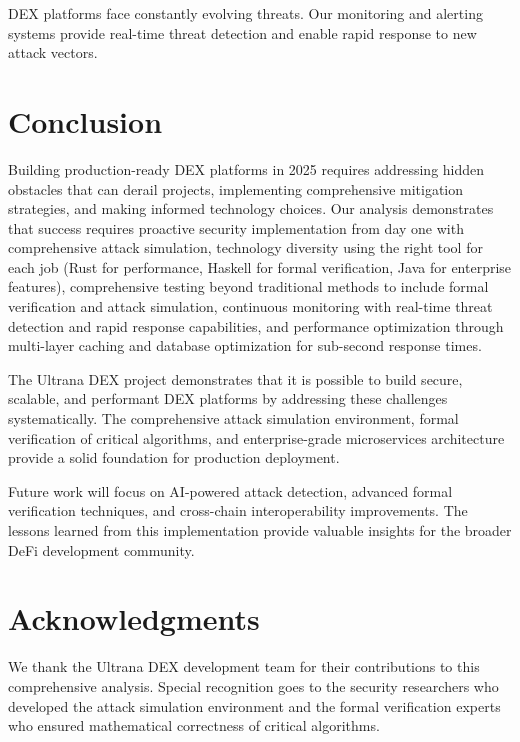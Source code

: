\documentclass[11pt,a4paper]{article}
\begin{document}
DEX platforms face constantly evolving threats. Our monitoring and alerting systems provide real-time threat detection and enable rapid response to new attack vectors.

\section{Conclusion}

Building production-ready DEX platforms in 2025 requires addressing hidden obstacles that can derail projects, implementing comprehensive mitigation strategies, and making informed technology choices. Our analysis demonstrates that success requires proactive security implementation from day one with comprehensive attack simulation, technology diversity using the right tool for each job (Rust for performance, Haskell for formal verification, Java for enterprise features), comprehensive testing beyond traditional methods to include formal verification and attack simulation, continuous monitoring with real-time threat detection and rapid response capabilities, and performance optimization through multi-layer caching and database optimization for sub-second response times.

The Ultrana DEX project demonstrates that it is possible to build secure, scalable, and performant DEX platforms by addressing these challenges systematically. The comprehensive attack simulation environment, formal verification of critical algorithms, and enterprise-grade microservices architecture provide a solid foundation for production deployment.

Future work will focus on AI-powered attack detection, advanced formal verification techniques, and cross-chain interoperability improvements. The lessons learned from this implementation provide valuable insights for the broader DeFi development community.

\section{Acknowledgments}

We thank the Ultrana DEX development team for their contributions to this comprehensive analysis. Special recognition goes to the security researchers who developed the attack simulation environment and the formal verification experts who ensured mathematical correctness of critical algorithms.

\end{document}
